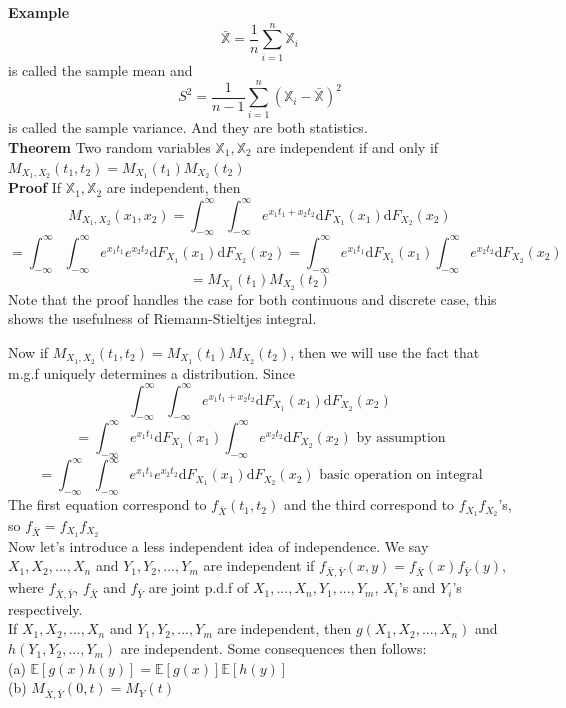 \documentclass[a4paper,12pt]{article}
\begin{document}
\textbf{Example}
$$\bar{\mathbb{X}} = \frac{1}{n}\sum_{i=1}^n\mathbb{X}_i$$
is called the sample mean and
$$S^2 = \frac{1}{n-1} \sum_{i=1}^n(\mathbb{X}_i - \bar{\mathbb{X}})^2$$
is called the sample variance. And they are both statistics.\\

\textbf{Theorem}
Two random variables $\mathbb{X}_1, \mathbb{X}_2$ are independent if and only if $M_{X_1, X_2}(t_1, t_2) = M_{X_1}(t_1)M_{X_2}(t_2)$\\

\textbf{Proof}
If $\mathbb{X}_1, \mathbb{X}_2$ are independent, then
$$M_{X_1, X_2}(x_1, x_2) = \int_{-\infty}^{\infty}\int_{-\infty}^{\infty} e^{x_1t_1+x_2t_2} \mathrm{d}F_{X_1}(x_1)\mathrm{d}F_{X_2}(x_2)$$
$$ = \int_{-\infty}^{\infty}\int_{-\infty}^{\infty} e^{x_1t_1}e^{x_2t_2} \mathrm{d}F_{X_1}(x_1)\mathrm{d}F_{X_2}(x_2) = \int_{-\infty}^{\infty}e^{x_1t_1}\mathrm{d}F_{X_1}(x_1)\int_{-\infty}^{\infty}e^{x_2t_2}\mathrm{d}F_{X_2}(x_2)$$
$$= M_{X_1}(t_1)M_{X_2}(t_2)$$
Note that the proof handles the case for both continuous and discrete case, this shows the usefulness of Riemann-Stieltjes integral.

Now if $M_{X_1, X_2}(t_1, t_2) = M_{X_1}(t_1)M_{X_2}(t_2)$, then we will use the fact that m.g.f uniquely determines a distribution.
Since
$$\int_{-\infty}^{\infty}\int_{-\infty}^{\infty} e^{x_1t_1+x_2t_2} \mathrm{d}F_{X_1}(x_1)\mathrm{d}F_{X_2}(x_2)$$
$$= \int_{-\infty}^{\infty}e^{x_1t_1}\mathrm{d}F_{X_1}(x_1)\int_{-\infty}^{\infty}e^{x_2t_2}\mathrm{d}F_{X_2}(x_2) \text{ by assumption}$$
$$= \int_{-\infty}^{\infty}\int_{-\infty}^{\infty} e^{x_1t_1}e^{x_2t_2} \mathrm{d}F_{X_1}(x_1)\mathrm{d}F_{X_2}(x_2) \text{ basic operation on integral}$$
The first equation correspond to $f_{\bar{X}}(t_1, t_2)$ and the third correspond to $f_{X_1}f_{X_2}$'s, so $f_{\bar{X}} = f_{X_1}f_{X_2}$\\

Now let's introduce a less independent idea of independence. We say $X_1, X_2, ..., X_n$ and $Y_1, Y_2, ..., Y_m$ are
independent if $f_{\bar{X}, \bar{Y}}(x, y) = f_{\bar{X}}(x)f_{\bar{Y}}(y)$, where $f_{\bar{X}, \bar{Y}}$, $f_{\bar{X}}$ and $f_{\bar{Y}}$ are joint p.d.f of $X_1, ..., X_n, Y_1, ..., Y_m$, $X_i$'s and $Y_i$'s respectively.\\

If $X_1, X_2, ..., X_n$ and $Y_1, Y_2, ..., Y_m$ are independent, then $g(X_1, X_2, ..., X_n)$ and $h(Y_1, Y_2, ..., Y_m)$ are independent. Some consequences then follows:\\
(a) $\mathbb{E}[g(x)h(y)] = \mathbb{E}[g(x)]\mathbb{E}[h(y)]$\\
(b) $M_{\bar{X}, \bar{Y}}( 0, t ) = M_Y(t)$\\
\end{document}
